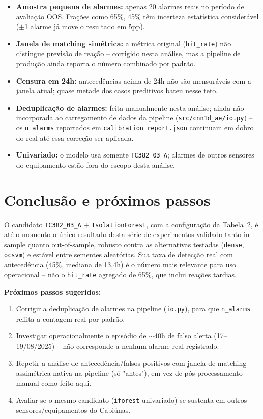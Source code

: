 \documentclass[11pt,a4paper]{article}
\begin{document}
\begin{itemize}
  \item \textbf{Amostra pequena de alarmes:} apenas 20 alarmes reais no
        período de avaliação OOS. Frações como 65\%, 45\% têm incerteza
        estatística considerável ($\pm$1 alarme já move o resultado em 5pp).
  \item \textbf{Janela de matching simétrica:} a métrica original
        (\texttt{hit\_rate}) não distingue previsão de reação -- corrigido
        nesta análise, mas a pipeline de produção ainda reporta o número
        combinado por padrão.
  \item \textbf{Censura em 24h:} antecedências acima de 24h não são
        mensuráveis com a janela atual; quase metade dos casos preditivos
        bateu nesse teto.
  \item \textbf{Deduplicação de alarmes:} feita manualmente nesta análise;
        ainda não incorporada ao carregamento de dados da pipeline
        (\texttt{src/cnn1d\_ae/io.py}) -- os \texttt{n\_alarms} reportados
        em \texttt{calibration\_report.json} continuam em dobro do real até
        essa correção ser aplicada.
  \item \textbf{Univariado:} o modelo usa somente \texttt{TC382\_03\_A};
        alarmes de outros sensores do equipamento estão fora do escopo
        desta análise.
\end{itemize}

\section{Conclusão e próximos passos}

O candidato \texttt{TC382\_03\_A} + \texttt{IsolationForest}, com a
configuração da Tabela~2, é até o momento o único resultado desta série de
experimentos validado tanto in-sample quanto out-of-sample, robusto contra
as alternativas testadas (\texttt{dense}, \texttt{ocsvm}) e estável entre
sementes aleatórias. Sua taxa de detecção real com antecedência (45\%,
mediana de 13,4h) é o número mais relevante para uso operacional -- não o
\texttt{hit\_rate} agregado de 65\%, que inclui reações tardias.

\textbf{Próximos passos sugeridos:}
\begin{enumerate}
  \item Corrigir a deduplicação de alarmes na pipeline (\texttt{io.py}),
        para que \texttt{n\_alarms} reflita a contagem real por padrão.
  \item Investigar operacionalmente o episódio de $\sim$40h de falso alerta
        (17--19/08/2025) -- não corresponde a nenhum alarme real registrado.
  \item Repetir a análise de antecedência/falsos-positivos com janela de
        matching assimétrica nativa na pipeline (só "antes"), em vez de
        pós-processamento manual como feito aqui.
  \item Avaliar se o mesmo candidato (\texttt{iforest} univariado) se
        sustenta em outros sensores/equipamentos do Cabiúnas.
\end{enumerate}
\end{document}
